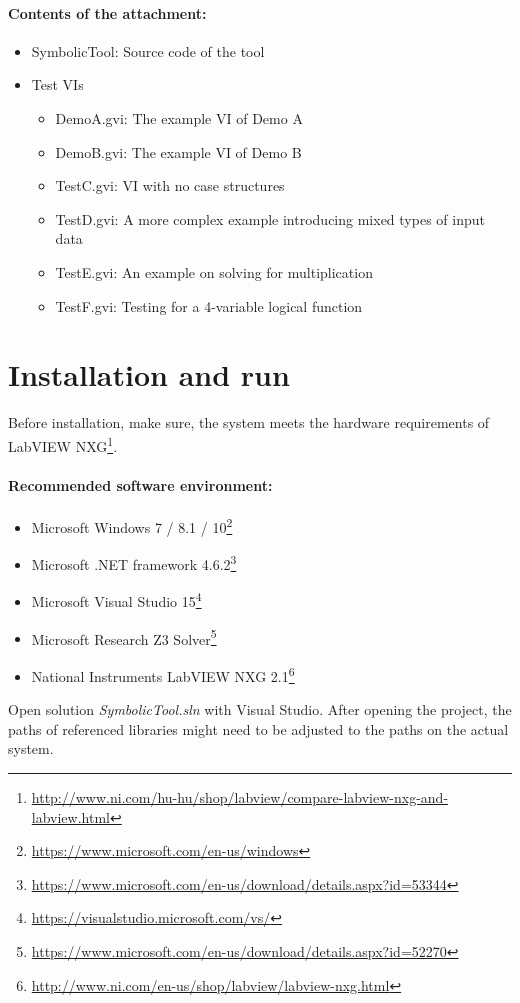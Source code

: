 \paragraph{Contents of the attachment:}
\begin{itemize}
\item SymbolicTool: Source code of the tool
\item Test VIs

\begin{itemize}
\item Demo\textunderscore A.gvi: The example VI of Demo A
\item Demo\textunderscore B.gvi: The example VI of Demo B
\item Test\textunderscore C.gvi: VI with no case structures
\item Test\textunderscore D.gvi: A more complex example introducing mixed types of input data
\item Test\textunderscore E.gvi: An example on solving for multiplication
\item Test\textunderscore F.gvi: Testing for a 4-variable logical function

\end{itemize}
\end{itemize}
\section{Installation and run}

Before installation, make sure, the system meets the hardware requirements of LabVIEW NXG\footnote{\url{http://www.ni.com/hu-hu/shop/labview/compare-labview-nxg-and-labview.html}}.
\paragraph{Recommended software environment:}
\begin{itemize}
\item Microsoft Windows 7 / 8.1 / 10\footnote{\url{https://www.microsoft.com/en-us/windows}}
\item Microsoft .NET framework 4.6.2\footnote{\url{https://www.microsoft.com/en-us/download/details.aspx?id=53344}}
\item Microsoft Visual Studio 15\footnote{\url{https://visualstudio.microsoft.com/vs/}}
\item Microsoft Research Z3 Solver\footnote{\url{https://www.microsoft.com/en-us/download/details.aspx?id=52270}}
\item National Instruments LabVIEW NXG 2.1\footnote{\url{http://www.ni.com/en-us/shop/labview/labview-nxg.html}}
\end{itemize}
Open solution \textit{SymbolicTool.sln} with Visual Studio. After opening the project, the paths of referenced libraries might need to be adjusted to the paths on the actual system. 

